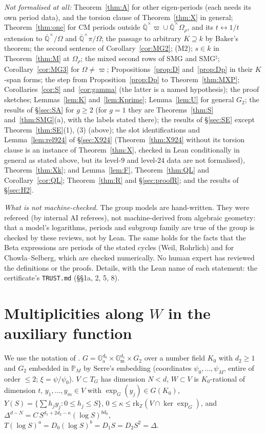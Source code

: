 \documentclass[11pt]{amsart}
\theoremstyle{definition}
\newcommand{\Qb}{\overline{\mathbb{Q}}}
\newcommand{\Z}{\mathbb{Z}}
\newcommand{\Ga}{\mathbb{G}_{\mathrm a}}
\newcommand{\Gm}{\mathbb{G}_{\mathrm m}}
\newcommand{\vp}{\varpi}
\begin{document}
\emph{Not formalised at all:} Theorem~\ref{thm:A} for other eigen-periods (each needs its own period data), and the
torsion clause of Theorem~\ref{thm:X} in general; Theorem~\ref{thm:one} for CM periods outside
$\Qb^\times\vp\cup\Qb^\times\Omega_\rho$, and its $t\leftrightarrow1/t$ extension to $\Qb^\times/\Omega$ and
$\Qb^\times\pi/\Omega$; the passage to arbitrary $K\supseteq k$ by Baker's theorem; the second sentence of
Corollary~\ref{cor:MG2}; (M2); $s\in k$ in Theorem~\ref{thm:M} at $\Omega_\rho$; the mixed second rows of SMG and
SMG$^\natural$; Corollary~\ref{cor:MG3} for $\Omega\ne\vp$; Propositions~\ref{prop:D} and~\ref{prop:Dp} in their $K$-span
forms; the step from Proposition~\ref{prop:Dp} to Theorem~\ref{thm:MXP}; Corollaries~\ref{cor:S} and~\ref{cor:gamma} (the
latter is a named hypothesis); the proof sketches; Lemmas~\ref{lem:K} and~\ref{lem:Kprime}; Lemma~\ref{lem:U} for
general $G_2$; the results of \S\ref{sec:SA} for $g\ge2$ (for $g=1$ they are Theorems~\ref{thm:S} and~\ref{thm:SMG}(a),
with the labels stated there); the results of \S\ref{sec:SE} except Theorem~\ref{thm:SE}(1), (3) (above); the slot
identifications and Lemma~\ref{lem:rel924} of \S\ref{sec:X924} (Theorem~\ref{thm:X924} without its torsion clause is an
instance of Theorem~\ref{thm:X}, checked in Lean conditionally in general as stated above, but its level-$9$ and level-$24$
data are not formalised), Theorem~\ref{thm:Xk}; and Lemma~\ref{lem:F}, Theorem~\ref{thm:QL} and
Corollary~\ref{cor:QL}; Theorem~\ref{thm:R} and \S\ref{sec:proofR}; and the results of \S\ref{sec:H2}.

\emph{What is not machine-checked.} The group models are hand-written. They were refereed (by internal AI referees), not
machine-derived from algebraic geometry: that a model's logarithms, periods and subgroup family are true of the group is
checked by these reviews, not by Lean. The same holds for the facts that the Beta expressions are periods of the stated
cycles (Weil, Rohrlich) and for Chowla--Selberg, which are checked numerically. No human expert has reviewed the
definitions or the proofs. Details, with the Lean name of each statement: the certificate's \texttt{TRUST.md} (\S\S1a, 2, 5,
8).



\appendix
\section{Multiplicities along $W$ in the auxiliary function}\label{app:U}

We use the notation of \cite[\S6]{W88}. $G=\Ga^{d_0}\times\Gm^{d_1}\times G_2$ over a number field $K_0$ with $d_2\ge1$ and
$G_2$ embedded in $\mathbb P_M$ by Serre's embedding (coordinates $\psi_0,\dots,\psi_M$, entire of order $\le2$;
$\xi=\psi/\psi_0$). $V\subset T_G$ has dimension $N<d$, $W\subset V$ is $K_0$-rational of dimension $t$, $y_1,\dots,y_m\in V$
with $\exp_G(y_j)\in G(K_0)$, $Y(S)=\{\sum h_jy_j: 0\le h_j\le S\}$, $0\le\kappa\le\mathrm{rk}_\Z(V\cap\ker\exp_G)$, and
$\Delta^{d-N}=C\,S^{d_1+2d_2-\kappa}(\log S)^{bd_0}$, $T(\log S)^a=D_0(\log S)^b=D_1S=D_2S^2=\Delta$.
\end{document}
